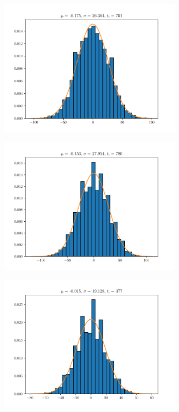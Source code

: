 \documentclass{article}
\begin{document}
\begin{figure}
\begin{subfigure}{.3\textwidth}
  \centering
  \includegraphics[width=1.1\linewidth]{hist4.pdf}
\end{subfigure}
\begin{subfigure}{.3\textwidth}
  \centering
  \includegraphics[width=1.1\linewidth]{hist5.pdf}
\end{subfigure}
\begin{subfigure}{.3\textwidth}
  \centering
  \includegraphics[width=1.1\linewidth]{hist6.pdf}

\end{subfigure}
\end{figure}
\end{document}
